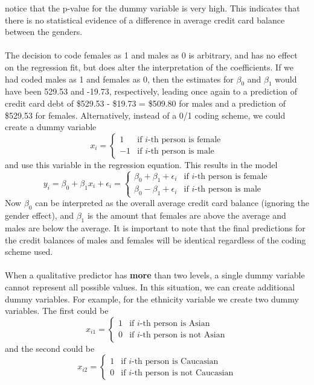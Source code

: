 notice that the p-value for the dummy variable is very high. This indicates
that there is no statistical evidence of a difference in average credit card balance between the genders.\\\\
The decision to code females as 1 and males as 0 is arbitrary, and has no effect on the regression fit, but does alter the interpretation of the coefficients.  If we had coded males as 1 and females as 0, then the estimates for $\beta_0$ and $\beta_1$ would have been 529.53 and -19.73, respectively, leading once again to a prediction of credit card debt of \$529.53 - \$19.73 = \$509.80 for males and a prediction of \$529.53 for females. Alternatively, instead of a 0/1 coding scheme, we could create a dummy variable
\[
x_i = 
\begin{cases}
    1 & \text{if $i$-th person is female}\\
    -1 & \text{if $i$-th person is male}
\end{cases}
\]
and use this variable in the regression equation. This results in the model
\[y_i = \beta_0 + \beta_1 x_i + \epsilon_i = 
\begin{cases}
    \beta_0 + \beta_1 + \epsilon_i & \text{if $i$-th person is female}\\
    \beta_0 - \beta_1 +  \epsilon_i & \text{if $i$-th person is male}
\end{cases}
\]
Now $\beta_0$ can be interpreted as the overall average credit card balance (ignoring the gender effect), and $\beta_1$ is the amount that females are above the average and males are below the average. It is important to note that the final predictions for the credit balances of males and females will be identical regardless of the coding scheme used.\\\\
When a qualitative predictor has \textbf{more} than two levels, a single dummy variable cannot represent all possible values. In this situation, we can create additional dummy variables. For example, for the ethnicity variable we create two dummy variables. The first could be
\[
x_{i1} = 
\begin{cases}
    1 & \text{if $i$-th person is Asian}\\
    0 & \text{if $i$-th person is not Asian}
\end{cases}
\]
and the second could be
\[
x_{i2} = 
\begin{cases}
    1 & \text{if $i$-th person is Caucasian}\\
    0 & \text{if $i$-th person is not Caucasian}
\end{cases}
\]
